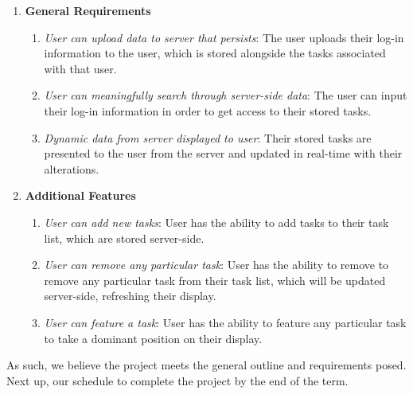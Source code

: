 \documentclass[10pt, letterpaper]{article}
\let\tab\quad
\begin{document}
\begin{enumerate}
	\item \textbf{General Requirements}
	\begin{enumerate}
		\item \emph{User can upload data to server that persists}: The user uploads their log-in information to the user, which is stored alongside the tasks associated with that user.
		\item \emph{User can meaningfully search through server-side data}: The user can input their log-in information in order to get access to their stored tasks.
		\item \emph{Dynamic data from server displayed to user}: Their stored tasks are presented to the user from the server and updated in real-time with their alterations.
	\end{enumerate}
	\item \textbf{Additional Features}
	\begin{enumerate}
			\item \emph{User can add new tasks}: User has the ability to add tasks to their task list, which are stored server-side.
		\item \emph{User can remove any particular task}: User has the ability to remove to remove any particular task from their task list, which will be updated server-side, refreshing their display.
		\item \emph{User can feature a task}: User has the ability to feature any particular task to take a dominant position on their display.
	\end{enumerate}
\end{enumerate}

\tab As such, we believe the project meets the general outline and requirements posed. Next up, our schedule to complete the project by the end of the term.
\end{document}
